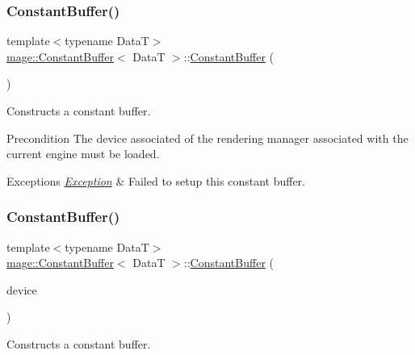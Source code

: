 \subsubsection{\texorpdfstring{Constant\+Buffer()}{ConstantBuffer()}\hspace{0.1cm}{\footnotesize\ttfamily [1/4]}}
{\footnotesize\ttfamily template$<$typename DataT$>$ \\
\hyperlink{classmage_1_1_constant_buffer}{mage\+::\+Constant\+Buffer}$<$ DataT $>$\+::\hyperlink{classmage_1_1_constant_buffer}{Constant\+Buffer} (\begin{DoxyParamCaption}{ }\end{DoxyParamCaption})}

Constructs a constant buffer.

\begin{DoxyPrecond}{Precondition}
The device associated of the rendering manager associated with the current engine must be loaded. 
\end{DoxyPrecond}

\begin{DoxyExceptions}{Exceptions}
{\em \hyperlink{classmage_1_1_exception}{Exception}} & Failed to setup this constant buffer. \\
\hline
\end{DoxyExceptions}
\hypertarget{classmage_1_1_constant_buffer_aaf32ac894aa2fe73bcbd9033e6e7efb0}{}\label{classmage_1_1_constant_buffer_aaf32ac894aa2fe73bcbd9033e6e7efb0} 
\subsubsection{\texorpdfstring{Constant\+Buffer()}{ConstantBuffer()}\hspace{0.1cm}{\footnotesize\ttfamily [2/4]}}
{\footnotesize\ttfamily template$<$typename DataT$>$ \\
\hyperlink{classmage_1_1_constant_buffer}{mage\+::\+Constant\+Buffer}$<$ DataT $>$\+::\hyperlink{classmage_1_1_constant_buffer}{Constant\+Buffer} (\begin{DoxyParamCaption}\item[{I\+D3\+D11\+Device5 $\ast$}]{device }\end{DoxyParamCaption})\hspace{0.3cm}{\ttfamily [explicit]}}

Constructs a constant buffer.

